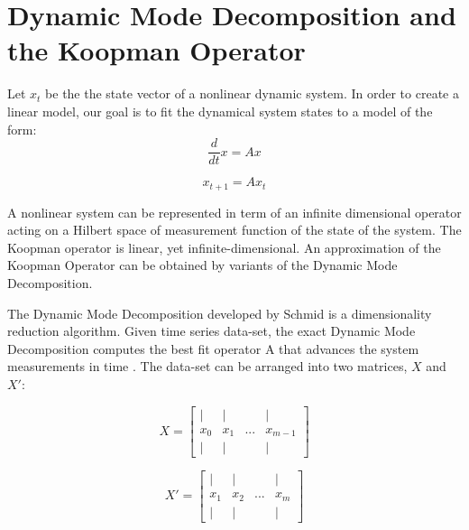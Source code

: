 \documentclass[twocolumn, letterpaper]{scrartcl}
\begin{document}
		
\section*{\fontsize{15}{15} \textbf{Dynamic Mode Decomposition and the Koopman Operator}}
     
    Let $x_{t}$ be the the state vector of a nonlinear dynamic system. In order to create a linear model, our goal is to fit the dynamical system states to a model of the form:
    \begin{equation} \label{eq:1}
     \frac{d}{d t} x = Ax
    \end{equation}
    
    \begin{equation} \label{eq:2}
     x_{t+1} = Ax_{t}
    \end{equation}
    
    A nonlinear system can be represented in term of an infinite dimensional operator acting on a Hilbert space of measurement function of the state of the system. The Koopman operator is linear, yet infinite-dimensional. An approximation of the Koopman Operator can be obtained by variants of the Dynamic Mode Decomposition. 
    
    The Dynamic Mode Decomposition developed by Schmid is a dimensionality reduction algorithm. Given time series data-set, the exact Dynamic Mode Decomposition computes the best fit operator A that advances the system measurements in time \cite{Tu}.
    The data-set can be arranged into two matrices, $X$ and $X'$:
    
    \begin{equation} \label{eq:3}
     X=
        \begin{bmatrix}
            \vert & \vert &  &  \vert\\
            x_{0}   & x_{1} & ...& x_{m-1} \\
            \vert & \vert &  & \vert 
        \end{bmatrix}
    \end{equation}
    
    \begin{equation} \label{eq:4}
     X' = 
        \begin{bmatrix}
            \vert & \vert &  &  \vert\\
            x_{1}   & x_{2} & ...& x_{m} \\
            \vert & \vert &  & \vert 
        \end{bmatrix}
    \end{equation}
    
\end{document}
